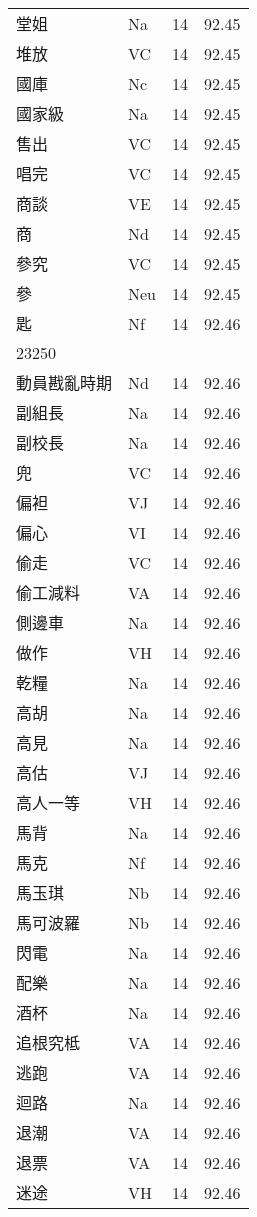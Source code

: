 \documentclass[twocolumn]{book}
\begin{document}
\begin{supertabular}{llrr}
堂姐 & Na & 14 &  92.45\\
堆放 & VC & 14 &  92.45\\
國庫 & Nc & 14 &  92.45\\
國家級 & Na & 14 &  92.45\\
售出 & VC & 14 &  92.45\\
唱完 & VC & 14 &  92.45\\
商談 & VE & 14 &  92.45\\
商 & Nd & 14 &  92.45\\
參究 & VC & 14 &  92.45\\
參 & Neu & 14 &  92.45\\
匙 & Nf & 14 &  92.46\\
23250\\
動員戡亂時期 & Nd & 14 &  92.46\\
副組長 & Na & 14 &  92.46\\
副校長 & Na & 14 &  92.46\\
兜 & VC & 14 &  92.46\\
偏袒 & VJ & 14 &  92.46\\
偏心 & VI & 14 &  92.46\\
偷走 & VC & 14 &  92.46\\
偷工減料 & VA & 14 &  92.46\\
側邊車 & Na & 14 &  92.46\\
做作 & VH & 14 &  92.46\\
乾糧 & Na & 14 &  92.46\\
高胡 & Na & 14 &  92.46\\
高見 & Na & 14 &  92.46\\
高估 & VJ & 14 &  92.46\\
高人一等 & VH & 14 &  92.46\\
馬背 & Na & 14 &  92.46\\
馬克 & Nf & 14 &  92.46\\
馬玉琪 & Nb & 14 &  92.46\\
馬可波羅 & Nb & 14 &  92.46\\
閃電 & Na & 14 &  92.46\\
配樂 & Na & 14 &  92.46\\
酒杯 & Na & 14 &  92.46\\
追根究柢 & VA & 14 &  92.46\\
逃跑 & VA & 14 &  92.46\\
迴路 & Na & 14 &  92.46\\
退潮 & VA & 14 &  92.46\\
退票 & VA & 14 &  92.46\\
迷途 & VH & 14 &  92.46\\

\end{supertabular}
\end{document}
